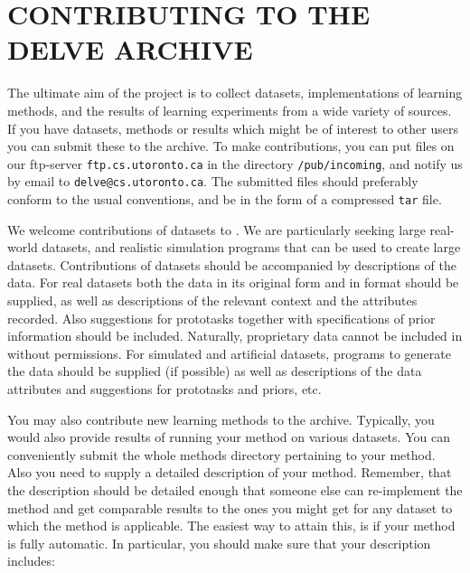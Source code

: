 %
%
\newpage

\section{CONTRIBUTING TO THE DELVE ARCHIVE}\label{app-submit}
\thispagestyle{plain}
\setcounter{figure}{0}

The ultimate aim of the \delve{} project is to collect datasets,
implementations of learning methods, and the results of learning
experiments from a wide variety of sources. If you have datasets,
methods or results which might be of interest to other users you can
submit these to the \delve{} archive. To make contributions, you can
put files on our ftp-server \texttt{ftp.cs.utoronto.ca} in the directory
\texttt{/pub/incoming}, and notify us by email to 
\texttt{delve@cs.utoronto.ca}. The submitted files should preferably
conform to the usual \delve{} conventions, and be in the form of a
compressed \texttt{tar} file.

We welcome contributions of datasets to \delve{}. We are particularly
seeking large real-world datasets, and realistic simulation programs
that can be used to create large datasets. Contributions of datasets
should be accompanied by descriptions of the data. For real datasets
both the data in its original form and in \delve{} format should be
supplied, as well as descriptions of the relevant context and the
attributes recorded. Also suggestions for prototasks together with
specifications of prior information should be included. Naturally,
proprietary data cannot be included in \delve{} without permissions.
For simulated and artificial datasets, programs to generate the data
should be supplied (if possible) as well as descriptions of the data
attributes and suggestions for prototasks and priors, etc.

You may also contribute new learning methods to the archive.
Typically, you would also provide results of running your method on
various \delve{} datasets. You can conveniently submit the whole
methods directory pertaining to your method. Also you need to supply a
detailed description of your method. Remember, that the description
should be detailed enough that someone else can re-implement the
method and get comparable results to the ones you might get for any
dataset to which the method is applicable.  The easiest way to attain
this, is if your method is fully automatic. In particular, you should
make sure that your description includes:

